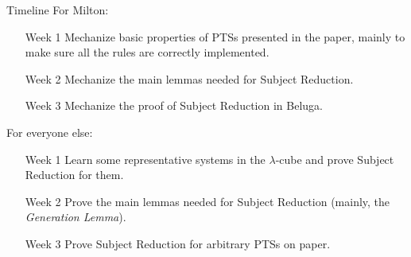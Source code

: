 \documentclass{beamer}
\begin{document}
    \begin{frame}{Timeline}
        For Milton:
        \begin{itemize}
            \item[Week 1] Mechanize basic properties of PTSs presented in the paper, mainly to make sure all the rules are correctly implemented.
                \pause
            \item[Week 2] Mechanize the main lemmas needed for Subject Reduction.
                \pause
            \item[Week 3] Mechanize the proof of Subject Reduction in Beluga.
        \end{itemize}

        \pause

        For everyone else:
        \begin{itemize}
            \item[Week 1] Learn some representative systems in the $\lambda$-cube and prove Subject Reduction for them.
                \pause
            \item[Week 2] Prove the main lemmas needed for Subject Reduction (mainly, the \textit{Generation Lemma}).
                \pause
            \item[Week 3] Prove Subject Reduction for arbitrary PTSs on paper.
        \end{itemize}
    \end{frame}
\end{document}

